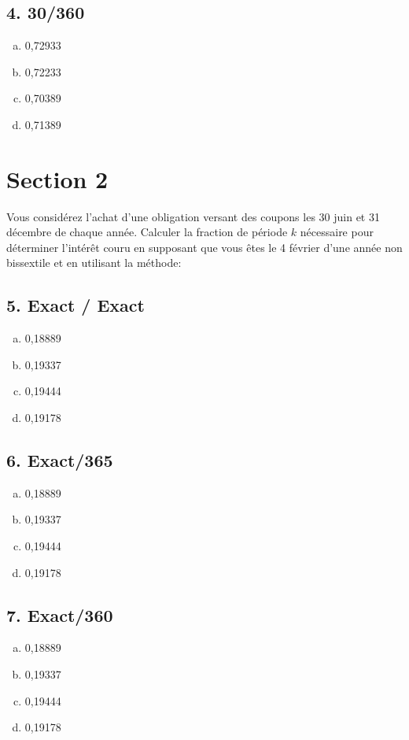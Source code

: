 \documentclass[10pt,a4paper]{article}
\begin{document}
\subsection*{4. 30/360}
\begin{enumerate}[a)]
\item 0,72933
\item 0,72233
\item 0,70389
\item 0,71389
\end{enumerate}

\newpage

\section*{Section 2}
Vous considérez l’achat d’une obligation versant des coupons les 30 juin et 31 décembre de chaque année. Calculer la fraction de période $k$ nécessaire pour déterminer l’intérêt couru en supposant que vous êtes le 4 février d’une année non bissextile et en utilisant la méthode:


\subsection*{5.  Exact / Exact} 
\begin{enumerate}[a)]
\item 0,18889
\item 0,19337
\item 0,19444
\item 0,19178
\end{enumerate}

\subsection*{6.  Exact/365} 
\begin{enumerate}[a)]
\item 0,18889
\item 0,19337
\item 0,19444
\item 0,19178
\end{enumerate}

\subsection*{7. Exact/360}
\begin{enumerate}[a)]
\item 0,18889
\item 0,19337
\item 0,19444
\item 0,19178
\end{enumerate}
\end{document}
